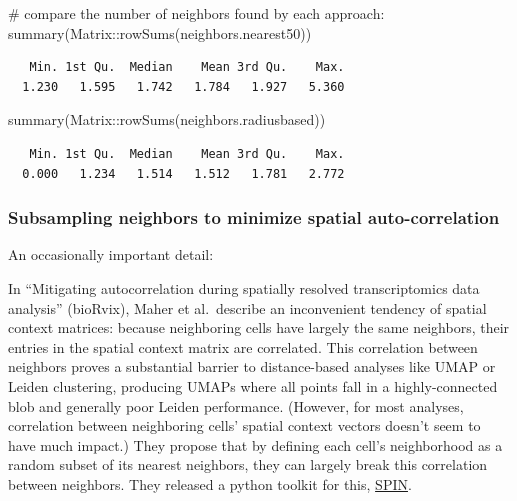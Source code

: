 \documentclass[
  letterpaper,
  DIV=11,
  numbers=noendperiod]{scrartcl}
\newenvironment{Shaded}{\begin{snugshade}}{\end{snugshade}}
\newcommand{\CommentTok}[1]{\textcolor[rgb]{0.37,0.37,0.37}{#1}}
\newcommand{\FunctionTok}[1]{\textcolor[rgb]{0.28,0.35,0.67}{#1}}
\newcommand{\NormalTok}[1]{\textcolor[rgb]{0.00,0.23,0.31}{#1}}
\newcommand{\SpecialCharTok}[1]{\textcolor[rgb]{0.37,0.37,0.37}{#1}}
\begin{document}
\begin{Shaded}
\begin{Highlighting}[]
\CommentTok{\# compare the number of neighbors found by each approach:}
\FunctionTok{summary}\NormalTok{(Matrix}\SpecialCharTok{::}\FunctionTok{rowSums}\NormalTok{(neighbors.nearest50))}
\end{Highlighting}
\end{Shaded}

\begin{verbatim}
   Min. 1st Qu.  Median    Mean 3rd Qu.    Max. 
  1.230   1.595   1.742   1.784   1.927   5.360 
\end{verbatim}

\begin{Shaded}
\begin{Highlighting}[]
\FunctionTok{summary}\NormalTok{(Matrix}\SpecialCharTok{::}\FunctionTok{rowSums}\NormalTok{(neighbors.radiusbased))}
\end{Highlighting}
\end{Shaded}

\begin{verbatim}
   Min. 1st Qu.  Median    Mean 3rd Qu.    Max. 
  0.000   1.234   1.514   1.512   1.781   2.772 
\end{verbatim}

\hypertarget{subsampling-neighbors-to-minimize-spatial-auto-correlation}{%
\subsubsection{Subsampling neighbors to minimize spatial
auto-correlation}\label{subsampling-neighbors-to-minimize-spatial-auto-correlation}}

An occasionally important detail:

In ``Mitigating autocorrelation during spatially resolved
transcriptomics data analysis'' (bioRvix), Maher et al.~describe an
inconvenient tendency of spatial context matrices: because neighboring
cells have largely the same neighbors, their entries in the spatial
context matrix are correlated. This correlation between neighbors proves
a substantial barrier to distance-based analyses like UMAP or Leiden
clustering, producing UMAPs where all points fall in a highly-connected
blob and generally poor Leiden performance. (However, for most analyses,
correlation between neighboring cells' spatial context vectors doesn't
seem to have much impact.) They propose that by defining each cell's
neighborhood as a random subset of its nearest neighbors, they can
largely break this correlation between neighbors. They released a python
toolkit for this, \href{https://github.com/wanglab-broad/spin}{SPIN}.
\end{document}
